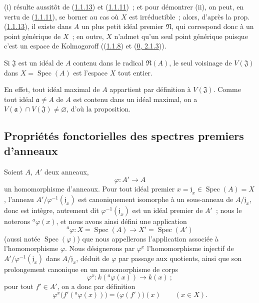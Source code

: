 (i) résulte aussitôt de (\hyperref[I.1.1.13-fr]{1.1.13}) et
(\hyperref[I.1.1.11-fr]{1.1.11})~; et pour démontrer (ii), on peut, en vertu de
(\hyperref[I.1.1.11-fr]{1.1.11}), se borner au cas où $X$ est irréductible~;
alors, d'après la prop. (\hyperref[I.1.1.13-fr]{1.1.13}), il existe dans $A$
un plus petit idéal premier $\mathfrak{N}$, qui correspond donc à un point
générique
de $X$~; en outre, $X$ n'admet qu'un seul point générique puisque c'est un
espace de Kolmogoroff ((\hyperref[I.1.1.8-fr]{1.1.8}) et
(\hyperref[0.2.1.3-fr]{0, 2.1.3})).

\begin{proposition}[1.1.15]
\label{I.1.1.15-fr}
Si $\mathfrak{J}$ est un idéal de $A$ contenu dans le radical
$\mathfrak{R}(A)$, le seul voisinage de $V(\mathfrak{J})$ dans
$X=\operatorname{Spec}(A)$ est l'espace $X$ tout entier.
\end{proposition}

En effet, tout idéal maximal de $A$ appartient par définition à
$V(\mathfrak{J})$. Comme tout idéal $\mathfrak{a}\neq A$ de $A$ est contenu dans un
idéal maximal, on a $V(\mathfrak{a})\cap V(\mathfrak{J})\neq\varnothing$,
d'où la proposition.

\subsection{Propriétés fonctorielles des spectres premiers d'anneaux}
\label{subsection:I.1.2-fr}

\begin{env}[1.2.1]
\label{I.1.2.1-fr}
Soient $A$, $A'$ deux anneaux,
\[
  \varphi:A'\longrightarrow A
\]
un homomorphisme d'anneaux. Pour tout idéal premier
$x=\mathfrak{j}_x\in\operatorname{Spec}(A)=X$, l'anneau
$A'/\varphi^{-1}(\mathfrak{j}_x)$ est canoniquement isomorphe à un
sous-anneau de $A/\mathfrak{j}_x$, donc est intègre, autrement dit
$\varphi^{-1}(\mathfrak{j}_x)$ est un idéal premier de $A'$~; nous le
noterons ${}^a\varphi(x)$, et nous avons ainsi défini une application
\[
  {}^a\varphi:X=\operatorname{Spec}(A)\longrightarrow
  X'=\operatorname{Spec}(A')
\]
(aussi notée $\operatorname{Spec}(\varphi)$) que nous appellerons
l'application associée à l'homomorphisme $\varphi$. Nous désignerons par
$\varphi^x$ l'homomorphisme injectif de
$A'/\varphi^{-1}(\mathfrak{j}_x)$ dans $A/\mathfrak{j}_x$, déduit de
$\varphi$ par passage aux quotients, ainsi que son prolongement canonique en
un monomorphisme de corps
\[
  \varphi^x:k({}^a\varphi(x))\longrightarrow k(x)~;
\]
pour tout $f'\in A'$, on a donc par définition
\begin{equation}
  \varphi^x\bigl(f'({}^a\varphi(x))\bigr)=\bigl(\varphi(f')\bigr)(x)
  \qquad(x\in X).
  \tag{1.2.1.1}\label{I.1.2.1.1-fr}
\end{equation}
\end{env}

